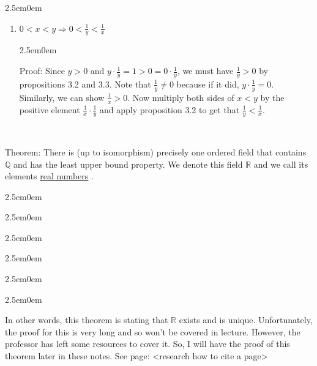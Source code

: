 \documentclass{book}
\newcommand{\hOne}{%
   \color{Black}%
   \fontsize{14}{16}\selectfont%
}
\newcommand{\hThree}{%
   \color{PineGreen}
   \fontsize{13}{15}\selectfont%
}
\newcommand{\teachComment}{
   \color{Orange}%
   \fontsize{12}{14}\selectfont%
}
\newenvironment{myIndent}{%
   \begin{adjustwidth}{2.5em}{0em}%
}{%
   \end{adjustwidth}%
}
\newcommand{\udefine}[1]{%
   \setulcolor{Red}%
   \setul{0.14em}{0.07em}%
   \ul{#1}%
}
\newcommand{\uuline}[2][.]{%
{\vphantom{a}\color{#1}%
\rlap{\rule[-0.18em]{\widthof{#2}}{0.06em}}%
\rlap{\rule[-0.32em]{\widthof{#2}}{0.06em}}}%
#2}
\newcommand{\retTwo}{\hfill\bigbreak}
\newcommand{\mySepTwo}[1][.]{%
   {\noindent\color{#1}{\rule{6.5in}{0.5mm}}}\\%
}
\begin{document}
{\begin{myIndent}
\begin{enumerate}
         \item $0<x<y \Rightarrow 0<\frac{1}{y}<\frac{1}{x}$
         {\begin{myIndent} \hThree
            Proof: Since $y>0$ and $y\cdot\frac{1}{y}=1>0=0\cdot\frac{1}{y}$,
            we must have $\frac{1}{y}>0$ by propositions 3.2 and 3.3.
            Note that $\frac{1}{y}\neq0$ because if it did,
            $y\cdot\frac{1}{y}=0$. \\ Similarly, we can show $\frac{1}{x}
            >0$. Now multiply both sides of $x<y$ by the positive element
            $\frac{1}{x}\cdot\frac{1}{y}$ and apply proposition 3.2
            to get that $\frac{1}{y}<\frac{1}{x}$.
            \retTwo
         \end{myIndent}}
      \end{enumerate}
   \end{myIndent}}

   \mySepTwo[Black]

   \hOne
   \uuline{Theorem}: There is (up to isomorphism) precisely one ordered field that contains $\mathbb{Q}$ and has the least upper bound property.
   We denote this field $\mathbb{R}$ and we call its elements 
   \udefine{real numbers}.
   
   \begin{myIndent}\begin{myIndent}\begin{myIndent}\begin{myIndent}
   \begin{myIndent}\begin{myIndent}
      {\teachComment
         In other words, this theorem is stating that $\mathbb{R}$ exists and is unique. Unfortunately, the proof for this is very long and so won't be covered in lecture. However, the professor has left some resources to cover it. So, I will have the proof of this theorem later in these notes. \newline
            See page: {\color{BrickRed} <research how to cite a page>}
      }
   \end{myIndent}\end{myIndent}
   \end{myIndent}\end{myIndent}\end{myIndent}\end{myIndent}

   \mySepTwo[Black]
\end{document}
